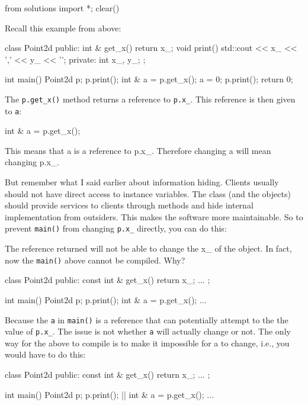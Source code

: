 \begin{python0}
from solutions import *; clear()
\end{python0}

Recall this example from above:

\begin{consolethree}[escapeinside=||]
class Point2d
{
public:
    int & get_x()
    {
        return x_;
    }
    void print()
    {
        std::cout << x_ << ',' << y_ << '\n';
    }
private:
    int x_, y_;
};

int main()
{
    Point2d p;
    p.print();
    int & a = p.get_x();
    a = 0;
    p.print();
    return 0;
}
\end{consolethree}

The \texttt{p.get\_x()} method returns a reference to \texttt{p.x\_}. This
reference is then given to \texttt{a}:

\begin{consolethree}[escapeinside=||]
int & a = p.get_x();
\end{consolethree}

This means that a is a reference to p.x\_. Therefore changing a will
mean changing p.x\_.

But remember what I said earlier about information hiding. Clients
usually should not have direct access to instance variables. The class
(and the objects) should provide services to clients through methods and
hide internal implementation from outsiders. This makes the software
more maintainable. So to prevent \texttt{main()} from changing
\texttt{p.x\_} directly, you can do this:

\begin{consolethree}[escapeinside=||]
class Point2d
{
public:
    || int & get_x()
    {
        return x_;
    }
    ...
\end{consolethree}

The reference returned will not be able to change the x\_ of the object.
In fact, now the \texttt{main()} above cannot be compiled. Why?

\begin{consolethree}[escapeinside=||]
class Point2d
{
public:
    const int & get_x()
    {
        return x_;
    }
    ...
};

int main()
{
    Point2d p;
    p.print();
    int & a = p.get_x();
    ...
}
\end{consolethree}

Because the \texttt{a} in \texttt{main()} is a reference that can
potentially attempt to the the value of \texttt{p.x\_}. The issue is not
whether \texttt{a} will actually change or not. The only way for the above
to compile is to make it impossible for a to change, i.e., you would
have to do this:

\begin{consolethree}[escapeinside=||]
class Point2d
{
public:
    const int & get_x()
    {
        return x_;
    }
    ...
};

int main()
{
    Point2d p;
    p.print();
    || int & a = p.get_x();
    ...
}
\end{consolethree}



